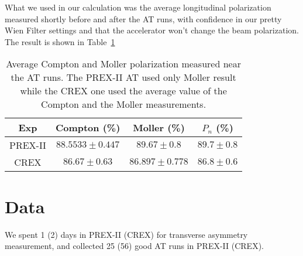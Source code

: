 What we used in our calculation was the average longitudinal polarization 
measured shortly before and after the AT runs, with confidence in our pretty Wien
Filter settings and that the accelerator won't change the beam polarization.
The result is shown in Table~\ref{tab:AT_polarization}
\begin{table}[!h]
    \centering
    \begin{tabular}{c | c c c}
    \hline
    Exp	& Compton (\%)	& Moller (\%)	& $P_n$ (\%) \\
    \hline
    PREX-II & $88.5533 \pm 0.447$   & $89.67 \pm 0.8$	& $89.7 \pm 0.8$  \\
    CREX    & $86.67 \pm 0.63$	& $86.897 \pm 0.778$	& $86.8 \pm 0.6$  \\
    \hline
    \end{tabular}
    \caption{Average Compton and Moller polarization measured near the AT runs. 
    The PREX-II AT used only Moller result while the CREX one used the average value of the 
    Compton and the Moller measurements.}
    \label{tab:AT_polarization}
\end{table}

\section{Data}

We spent 1 (2) days in PREX-II (CREX) for transverse asymmetry measurement,
and collected 25 (56) good AT runs in PREX-II (CREX).

